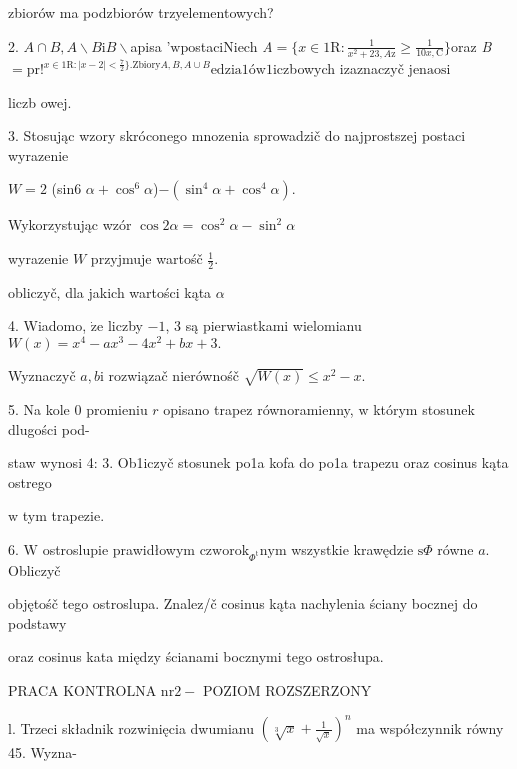 \documentclass[a4paper,12pt]{article}
\begin{document}
zbiorów ma podzbiorów trzyelementowych?

2. $A\cap B, A\backslash B\mathrm{i}B\backslash $apisa '$\mathrm{w}\mathrm{p}$ostaciNiech {\it A}$=\displaystyle \{x\in 1\mathrm{R}:\frac{1}{x^{2}+23,A\mathrm{z}}\geq\frac{1}{10x,\mathrm{C}}\}$oraz {\it B}$=\mathrm{p}\mathrm{r}!^{x\in 1\mathrm{R}:|x-2|<\frac{7}{2}\}.\mathrm{Z}\mathrm{b}\mathrm{i}\mathrm{o}\mathrm{r}\mathrm{y}A,B,A\cup B}\mathrm{e}\mathrm{d}\mathrm{z}\mathrm{i}\mathrm{a}1\text{ó} \mathrm{w}1$iczbowych izaznaczyč j$\mathrm{e}\mathrm{n}\mathrm{a}\mathrm{o}\mathrm{s}\mathrm{i}$

liczb owej.

3. Stosując wzory skróconego mnozenia sprowadzič do najprostszej postaci wyrazenie

$W=2$ (sin6 $\alpha+\cos^{6}\alpha$)$-(\sin^{4}\alpha+\cos^{4}\alpha).$

Wykorzystując wzór $\cos 2\alpha = \cos^{2}\alpha-\sin^{2}\alpha$

wyrazenie $W$ przyjmuje wartośč $\displaystyle \frac{1}{2}.$

obliczyč, dla jakich wartości kąta $\alpha$

4. Wiadomo, $\dot{\mathrm{z}}\mathrm{e}$ liczby $-1$, 3 są pierwiastkami wielomianu $W(x)=x^{4}-ax^{3}-4x^{2}+bx+3.$

Wyznaczyč $a, b\mathrm{i}$ rozwiązač nierównośč $\sqrt{W(x)}\leq x^{2}-x.$

5. Na kole $0$ promieniu $r$ opisano trapez równoramienny, $\mathrm{w}$ którym stosunek dlugości pod-

staw wynosi 4: 3. Ob1iczyč stosunek po1a kofa do po1a trapezu oraz cosinus kąta ostrego

$\mathrm{w}$ tym trapezie.

6. $\mathrm{W}$ ostroslupie prawidłowym $\mathrm{c}\mathrm{z}\mathrm{w}\mathrm{o}\mathrm{r}\mathrm{o}\mathrm{k}_{\Phi^{\mathrm{t}}}\mathrm{n}\mathrm{y}\mathrm{m}$ wszystkie krawędzie $\mathrm{s}\Phi$ równe $a$. Obliczyč

objętośč tego ostroslupa. Znalez/č cosinus kąta nachylenia ściany bocznej do podstawy

oraz cosinus kata między ścianami bocznymi tego ostrosłupa.





PRACA KONTROLNA $\mathrm{n}\mathrm{r}2-$ POZIOM ROZSZERZONY

l. Trzeci składnik rozwinięcia dwumianu $(\displaystyle \sqrt[3]{x}+\frac{1}{\sqrt{x}})^{n}$ ma współczynnik równy 45. Wyzna-
\end{document}
